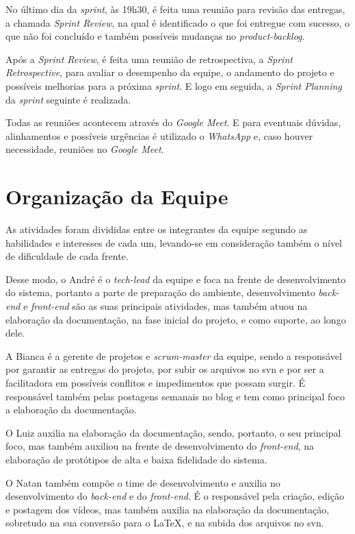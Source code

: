 \documentclass[
    12pt,               %
    openright,          %
    oneside,
    a4paper,            %
    english,            %
    brazil              %
    ]{ifsp-spo-inf-ctds} %
\begin{document}
No último dia da \textit{\gls{sprint}}, às 19h30, é feita uma reunião para revisão das entregas, a chamada \textit{Sprint Review}, na qual é identificado o que foi entregue com sucesso, o que não foi concluído e também possíveis mudanças no \textit{\gls{product-backlog}}. 


Após a \textit{Sprint Review}, é feita uma reunião de retrospectiva, a \textit{Sprint Retrospective}, para avaliar o desempenho da equipe, o andamento do projeto e possíveis melhorias para a próxima \textit{\gls{sprint}}. E logo em seguida, a \textit{Sprint Planning} da \textit{\gls{sprint}} seguinte é realizada.


Todas as reuniões acontecem através do \textit{Google Meet}.
E para eventuais dúvidas, alinhamentos e possíveis urgências é utilizado o \textit{WhatsApp} e, caso houver necessidade, reuniões no \textit{Google Meet}. 


\section{Organização da Equipe}
As atividades foram divididas entre os integrantes da equipe segundo as habilidades e interesses de cada um, levando-se em consideração também o nível de dificuldade de cada frente.


Desse modo, o André é o \textit{\gls{tech-lead}} da equipe e foca na frente de desenvolvimento do sistema, portanto a parte de preparação do ambiente, desenvolvimento \textit{\gls{back-end}} e \textit{\gls{front-end}} são as suas principais atividades, mas também atuou na elaboração da documentação, na fase inicial do projeto, e como suporte, ao longo dele.

A Bianca é a gerente de projetos e \textit{\gls{scrum-master}} da equipe, sendo a responsável por garantir as entregas do projeto, por subir os arquivos no \ac{svn} e por ser a facilitadora em possíveis conflitos e impedimentos que possam surgir. É responsável também pelas postagens semanais no blog e tem como principal foco a elaboração da documentação.

O Luiz auxilia na elaboração da documentação, sendo, portanto, o seu principal foco, mas também auxiliou na frente de desenvolvimento do \textit{\gls{front-end}}, na elaboração de protótipos de alta e baixa fidelidade do sistema.

O Natan também compõe o time de desenvolvimento e auxilia no desenvolvimento do \textit{\gls{back-end}} e do \textit{\gls{front-end}}. É o responsável pela criação, edição e postagem dos vídeos, mas também auxilia na elaboração da documentação, sobretudo na sua conversão para o LaTeX, e na subida dos arquivos no \ac{svn}.
\end{document}
